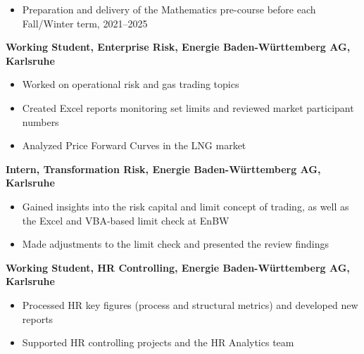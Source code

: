 \documentclass[a4paper,11pt]{article}
\begin{document}
\begin{description}[style=nextline, labelwidth=4cm, labelsep=1cm, leftmargin=5cm, itemsep=0.3em]
    \begin{itemize}[left=0.4cm, label=\textbullet, itemsep=0.1em, labelsep=0.3cm, topsep=0pt]
        \item Preparation and delivery of the Mathematics pre-course before each Fall/Winter term, 2021–2025
    \end{itemize}
    \item[08/2021 -- 01/2022] \textbf{Working Student, Enterprise Risk, Energie Baden-Württemberg AG, Karlsruhe}
    \begin{itemize}[left=0.4cm, label=\textbullet, itemsep=0.1em, labelsep=0.3cm, topsep=0pt]
        \item Worked on operational risk and gas trading topics
        \item Created Excel reports monitoring set limits and reviewed market participant numbers
        \item Analyzed Price Forward Curves in the LNG market
    \end{itemize}
    \item[06/2020 -- 08/2020] \textbf{Intern, Transformation Risk, Energie Baden-Württemberg AG, Karlsruhe}
    \begin{itemize}[left=0.4cm, label=\textbullet, itemsep=0.1em, labelsep=0.3cm, topsep=0pt]
        \item Gained insights into the risk capital and limit concept of trading, as well as the Excel and VBA-based limit check at EnBW
        \item Made adjustments to the limit check and presented the review findings
    \end{itemize}
    \item[05/2019 -- 12/2020] \textbf{Working Student, HR Controlling, Energie Baden-Württemberg AG, Karlsruhe}
    \begin{itemize}[left=0.4cm, label=\textbullet, itemsep=0.1em, labelsep=0.3cm, topsep=0pt]
        \item Processed HR key figures (process and structural metrics) and developed new reports
        \item Supported HR controlling projects and the HR Analytics team
    \end{itemize}
\end{description}
\end{document}
